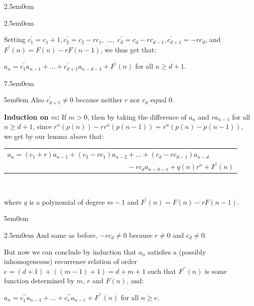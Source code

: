\documentclass{book}
\newenvironment{myIndent}{%
   \begin{adjustwidth}{2.5em}{0em}%
}{%
   \end{adjustwidth}%
}
\newenvironment{myDindent}{%
   \begin{adjustwidth}{5em}{0em}%
}{%
   \end{adjustwidth}%
}
\newenvironment{myTindent}{%
   \begin{adjustwidth}{7.5em}{0em}%
}{%
   \end{adjustwidth}%
}
\newcommand{\blab}[1]{\textbf{#1}}
\newcommand{\pprime}{{\prime\prime}}
\newcommand{\retTwo}{\hfill\bigbreak}
\begin{document}
\begin{myIndent}
\begin{myIndent}
         Setting $c_1^\prime = c_1 + 1, c_2^\prime = c_2 - rc_1,\phantom{.} \ldots,\phantom{.} c_d^\prime = c_d - rc_{d-1}, c_{d+1}^\prime = -rc_d$, and $F^\prime(n) = F(n) - rF(n - 1)$, we thus get that:

         {\centering$a_n = c_1^\prime a_{n-1} + \ldots + c_{d+1}^\prime a_{n-d-1} + F^\prime(n)$ for all $n \geq d + 1$.\par}
         
         \begin{myTindent}\begin{myDindent}\color{VioletRed}
            Also $c_{d+1}^\prime \neq 0$ because neither $r$ nor $c_d$ equal $0$.\retTwo
         \end{myDindent}\end{myTindent}

         
         \blab{Induction on $m$:} If $m > 0$, then by taking the difference of $a_n$ and $ra_{n-1}$ for all $n \geq d + 1$, since $r^n(p(n)) - rr^n(p(n-1)) = r^n(p(n) - p(n-1))$, we get by our lemma above that:\\ [-12pt]

         {\center
         \begin{tabular}{l}
            $a_n = (c_1 + r)a_{n-1} + (c_2 - rc_1)a_{n-2} + \ldots + (c_d - rc_{d-1})a_{n-d}$ \\ $\phantom{a_n = (c_1 + r)a_{n-1} + (c_2 - rc_1)a_{n-2}} - rc_da_{n-d-1} + q(n)r^n + F^\prime(n)$
         \end{tabular}\\ [6pt]\par}

         where $q$ is a polynomial of degree $m - 1$ and $F^\prime(n) = F(n) - rF(n-1)$.
         
         \begin{myDindent}\begin{myIndent}\color{VioletRed}
            And same as before, $-r c_d \neq 0$ because $r \neq 0$ and $c_d \neq 0$.\retTwo
         \end{myIndent}\end{myDindent}

         But now we can conclude by induction that $a_n$ satisfies a (possibly inhomogeneous) recurrence relation of order $e = (d + 1) + ((m - 1) + 1) = d + m + 1$ such that $F^\pprime(n)$ is some function determined by $m$, $r$ and $F(n)$, and:
         
         {\centering$a_n = c_1^\pprime a_{n-1} + \ldots + c_{e}^\pprime a_{n-e} + F^\pprime(n)$ for all $n \geq e$.\\ [26pt]\par}
   \end{myIndent}


\end{myIndent}
\end{document}
